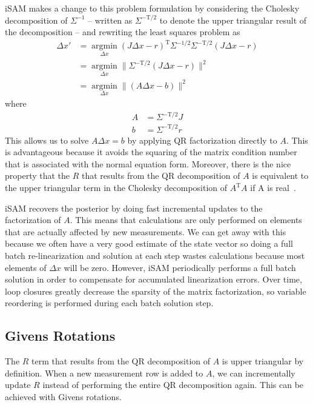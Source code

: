 \documentclass[conference]{IEEEtran}
\begin{document}
iSAM makes a change to this problem formulation by considering the Cholesky decomposition
of $\Sigma^{-1}$ -- written as $\Sigma^{-\text{T}/2}$ to denote the upper triangular
result of the decomposition --  and rewriting the least squares problem as
\begin{align*}
    \Delta x' &= \underset{\Delta x}{\operatorname{argmin}} (J\Delta x - r)^{\text{T}}
\Sigma^{-1/2}\Sigma^{-\text{T}/2} (J\Delta x - r) \\
  &= \underset{\Delta x}{\operatorname{argmin}} \| \Sigma^{-\text{T}/2}(J\Delta x - r)
  \|^2\\
&= \underset{\Delta x}{\operatorname{argmin}} \| (A\Delta x - b)\|^2
\end{align*}
where
\begin{align*}
  A &= \Sigma^{-\text{T}/2}J \\
  b &= \Sigma^{-\text{T}/2}r
\end{align*}
This allows us to solve $A\Delta x = b$ by applying QR factorization directly to $A$. This
is advantageous because it avoids the squaring of the matrix condition number that is
associated with the normal equation form. Moreover, there is the nice property that the
$R$ that results from the QR decomposition of $A$ is equivalent to the upper triangular
term in the Cholesky decomposition of $A^{\text{T}}A$ if A is real~\cite{Kaess08tro}.

iSAM recovers the posterior by doing fast incremental updates to the factorization of $A$.
This means that calculations are only performed on elements that are actually affected by
new measurements. We can get away with this because we often have a very good estimate of
the state vector so doing a full batch re-linearization and solution at each step wastes
calculations because most elements of $\Delta x$ will be zero. However, iSAM periodically
performs a full batch solution in order to compensate for accumulated linearization
errors. Over time, loop closures greatly decrease the sparsity of the matrix
factorization, so variable reordering is performed during each batch solution step. 

\subsection{Givens Rotations}
\label{sub:givensrotations}

The $R$ term that results from the QR decomposition of $A$ is upper triangular by
definition. When a new measurement row is added to $A$, we can incrementally update $R$
instead of performing the entire QR decomposition again. This can be achieved with Givens
rotations.
\end{document}
